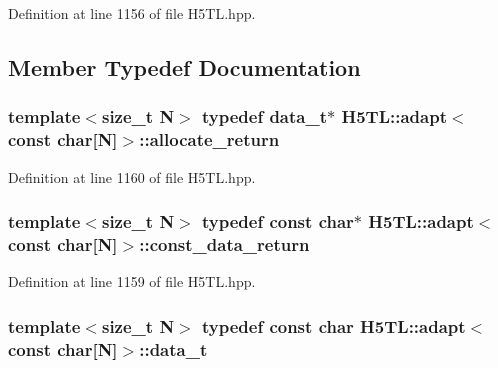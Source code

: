 Definition at line 1156 of file H5\-T\-L.\-hpp.



\subsection{Member Typedef Documentation}
\hypertarget{struct_h5_t_l_1_1adapt_3_01const_01char[_n]_4_ac3d3bf85390126994e3876cda484bbe2}{
\subsubsection[{allocate\-\_\-return}]{\setlength{\rightskip}{0pt plus 5cm}template$<$size\-\_\-t N$>$ typedef {\bf data\-\_\-t}$\ast$ {\bf H5\-T\-L\-::adapt}$<$ const char\mbox{[}N\mbox{]}$>$\-::{\bf allocate\-\_\-return}}}\label{struct_h5_t_l_1_1adapt_3_01const_01char[_n]_4_ac3d3bf85390126994e3876cda484bbe2}


Definition at line 1160 of file H5\-T\-L.\-hpp.

\hypertarget{struct_h5_t_l_1_1adapt_3_01const_01char[_n]_4_a5053e82858247b9c7497e610f23391a5}{
\subsubsection[{const\-\_\-data\-\_\-return}]{\setlength{\rightskip}{0pt plus 5cm}template$<$size\-\_\-t N$>$ typedef const char$\ast$ {\bf H5\-T\-L\-::adapt}$<$ const char\mbox{[}N\mbox{]}$>$\-::{\bf const\-\_\-data\-\_\-return}}}\label{struct_h5_t_l_1_1adapt_3_01const_01char[_n]_4_a5053e82858247b9c7497e610f23391a5}


Definition at line 1159 of file H5\-T\-L.\-hpp.

\hypertarget{struct_h5_t_l_1_1adapt_3_01const_01char[_n]_4_a74d18aaf246764491c0bb12be80e607b}{
\subsubsection[{data\-\_\-t}]{\setlength{\rightskip}{0pt plus 5cm}template$<$size\-\_\-t N$>$ typedef const char {\bf H5\-T\-L\-::adapt}$<$ const char\mbox{[}N\mbox{]}$>$\-::{\bf data\-\_\-t}}}\label{struct_h5_t_l_1_1adapt_3_01const_01char[_n]_4_a74d18aaf246764491c0bb12be80e607b}


